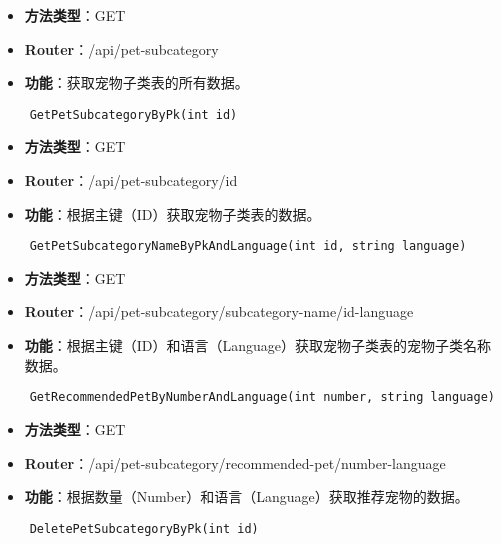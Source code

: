 \begin{itemize}
	\item \textbf{方法类型}：GET
	\item \textbf{Router}：/api/pet-subcategory
	\item \textbf{功能}：获取宠物子类表的所有数据。
\end{itemize}

\begin{verbatim}
	GetPetSubcategoryByPk(int id)
\end{verbatim}

\begin{itemize}
	\item \textbf{方法类型}：GET
	\item \textbf{Router}：/api/pet-subcategory/{id}
	\item \textbf{功能}：根据主键（ID）获取宠物子类表的数据。
\end{itemize}

\begin{verbatim}
	GetPetSubcategoryNameByPkAndLanguage(int id, string language)
\end{verbatim}

\begin{itemize}
	\item \textbf{方法类型}：GET
	\item \textbf{Router}：/api/pet-subcategory/subcategory-name/{id}-{language}
	\item \textbf{功能}：根据主键（ID）和语言（Language）获取宠物子类表的宠物子类名称数据。
\end{itemize}

\begin{verbatim}
	GetRecommendedPetByNumberAndLanguage(int number, string language)
\end{verbatim}

\begin{itemize}
	\item \textbf{方法类型}：GET
	\item \textbf{Router}：/api/pet-subcategory/recommended-pet/{number}-{language}
	\item \textbf{功能}：根据数量（Number）和语言（Language）获取推荐宠物的数据。
\end{itemize}

\begin{verbatim}
	DeletePetSubcategoryByPk(int id)
\end{verbatim}

